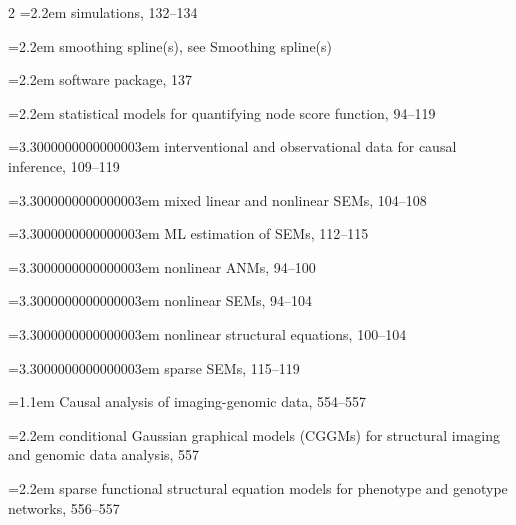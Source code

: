 \begin{multicols}{2}
\noindent\hangindent=2.2em \hspace*{1.1em}simulations, 132--134\par
\noindent\hangindent=2.2em \hspace*{1.1em}smoothing spline(s), see Smoothing spline(s)\par
\noindent\hangindent=2.2em \hspace*{1.1em}software package, 137\par
\noindent\hangindent=2.2em \hspace*{1.1em}statistical models for quantifying node score function, 94--119\par
\noindent\hangindent=3.3000000000000003em \hspace*{2.2em}interventional and observational data for causal inference, 109--119\par
\noindent\hangindent=3.3000000000000003em \hspace*{2.2em}mixed linear and nonlinear SEMs, 104--108\par
\noindent\hangindent=3.3000000000000003em \hspace*{2.2em}ML estimation of SEMs, 112--115\par
\noindent\hangindent=3.3000000000000003em \hspace*{2.2em}nonlinear ANMs, 94--100\par
\noindent\hangindent=3.3000000000000003em \hspace*{2.2em}nonlinear SEMs, 94--104\par
\noindent\hangindent=3.3000000000000003em \hspace*{2.2em}nonlinear structural equations, 100--104\par
\noindent\hangindent=3.3000000000000003em \hspace*{2.2em}sparse SEMs, 115--119\par
\noindent\hangindent=1.1em Causal analysis of imaging-genomic data, 554--557\par
\noindent\hangindent=2.2em \hspace*{1.1em}conditional Gaussian graphical models (CGGMs) for structural imaging and genomic data analysis, 557\par
\noindent\hangindent=2.2em \hspace*{1.1em}sparse functional structural equation models for phenotype and genotype networks, 556--557\par

\end{multicols}
